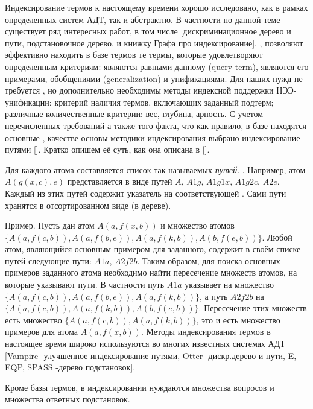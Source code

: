 Индексирование термов к настоящему времени хорошо исследовано, как в рамках определенных систем АДТ, так и абстрактно. В частности по данной теме существует ряд интересных работ, в том числе [дискриминационное дерево и пути, подстановочное дерево, и книжку Графа про индексирование]. , позволяют эффективно находить в базе термов те термы, которые удовлетворяют определенным критериям: являются равными данному (query term), являются его примерами, обобщениями (generalization) и унификациями. Для наших нужд не требуется , но дополнительно необходимы методы индексной поддержки НЭЭ-унификации: критерий наличия термов, включающих заданный подтерм; различные количественные критерии: вес, глубина, арность. С учетом перечисленных требований а также того факта, что как правило, в базе находятся основные , качестве основы методики индексирования выбрано индексирование путями []. Кратко опишем её суть, как она описана в [].

Для каждого атома составляется список так называемых \emph{путей}. \rem{...}{Надо привести формальное определение пути из [макКьюн]]}. Например, атом $A(g(x,c),e)$ представляется в виде путей $A$, $A1g$, $A1g1x$, $A1g2c$, $A2e$. Каждый из этих путей содержит указатель на соответствующей . Сами пути хранятся в отсортированном виде (в дереве).

Пример. Пусть дан атом $A(a,f(x,b))$ и множество атомов $\{A(a,f(c,b)), A(a,f(b,e)),A(a,f(k,b)), A(b,f(e,b))\}$. Любой атом, являющийся основным примером для заданного, содержит в своём списке путей следующие пути: $A1a$, $A2f2b$. Таким образом, для поиска основных примеров заданного атома необходимо найти пересечение множеств атомов, на которые указывают пути.  В частности путь $A1a$ указывает на множество $\{A(a,f(c,b)), A(a,f(b,e)),A(a,f(k,b))\}$, а путь $A2f2b$ на $\{A(a,f(c,b)), A(a,f(k,b)), A(b,f(e,b))\}$. Пересечение этих множеств есть множество $\{A(a,f(c,b)),A(a,f(k,b))\}$, это и есть множество примеров для атома $A(a,f(x,b))$. Методы индексирования термов в настоящее время широко используются во многих известных системах АДТ [Vampire -улучшенное индексирование путями, Otter -дискр.дерево и пути, E, EQP, SPASS -дерево подстановок].

Кроме базы термов, в индексировании нуждаются множества вопросов и множества ответных подстановок.

